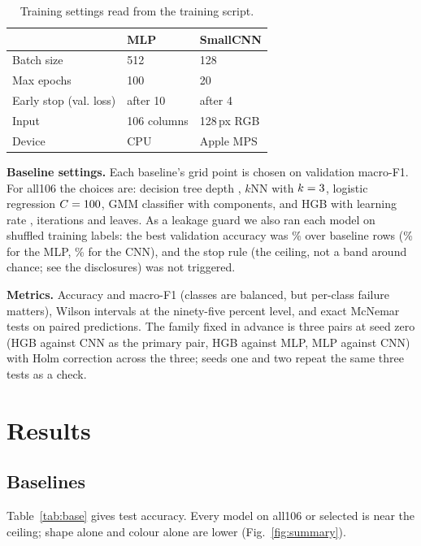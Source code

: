 \documentclass[conference,a4paper]{IEEEtran}
\begin{document}
\begin{table}[t]
\centering\footnotesize
\caption{Training settings read from the training script.}\label{tab:nn}
\begin{tabular}{lll}
\toprule
 & MLP & SmallCNN\\
\midrule
Batch size & 512 & 128\\
Max epochs & 100 & 20\\
Early stop (val. loss) & after 10 & after 4\\
Input & 106 columns & 128\,px RGB\\
Device & CPU & Apple MPS\\
\bottomrule
\end{tabular}
\end{table}

\textbf{Baseline settings.} Each baseline's grid point is chosen on validation macro-F1. For all106 the choices are: decision tree depth \ParamTreeAllOneZeroSixMaxDepth, $k$NN with $k=3$, logistic regression $C=100$, GMM classifier with \ParamGmmAllOneZeroSixNComponents{} components, and HGB with learning rate \ParamHgbAllOneZeroSixLearningRate, \ParamHgbAllOneZeroSixMaxIter{} iterations and \ParamHgbAllOneZeroSixMaxLeafNodes{} leaves. As a leakage guard we also ran each model on shuffled training labels: the best validation accuracy was \ControlBaselineMaxValAccPct\% over \ControlBaselineRows{} baseline rows (\ControlMlpValAccPct\% for the MLP, \ControlCnnValAccPct\% for the CNN), and the stop rule (the ceiling, not a band around chance; see the disclosures) was not triggered.

\textbf{Metrics.} Accuracy and macro-F1 (classes are balanced, but per-class failure matters), Wilson intervals at the ninety-five percent level, and exact McNemar tests on paired predictions. The family fixed in advance is three pairs at seed zero (HGB against CNN as the primary pair, HGB against MLP, MLP against CNN) with Holm correction across the three; seeds one and two repeat the same three tests as a check.

\section{Results}
\subsection{Baselines}
Table~\ref{tab:base} gives test accuracy. Every model on all106 or selected is near the ceiling; shape alone and colour alone are lower (Fig.~\ref{fig:summary}).
\end{document}
